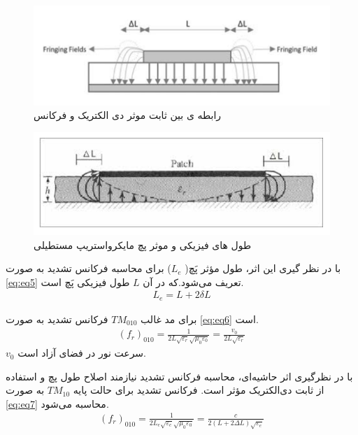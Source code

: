 \begin{figure}
	\centering
	\includegraphics[scale=0.3]{Images/fig10.png}
	\caption{رابطه ی بین ثابت موثر دی الکتریک و فرکانس}
	\label{fig10}
\end{figure}

\begin{figure}
	\centering
	\includegraphics[scale=0.3]{Images/fig11.png}
	\caption{طول های فیزیکی و موثر پچ مایکرواستریپ مستطیلی}
	\label{fig11}
\end{figure}

با در نظر گیری این اثر، طول مؤثر پَچ(
$L_{e}$)
برای محاسبه فرکانس تشدید به صورت 
\eqref{eq:eq5}
 تعریف می‌شود.که در آن 
 $L$
  طول فیزیکی پَچ است.
\begin{align}
	\label{eq:eq5}
	L_{e} = L + 2\delta L
\end{align}

برای مد غالب
$TM_{010}$
فرکانس تشدید به صورت 
\eqref{eq:eq6}
است.
\begin{align}
	\label{eq:eq6}
	(f_r)_{010} = \frac{1}{2L\sqrt{\varepsilon_r}\sqrt{\mu_0\varepsilon_0}} = \frac{v_0}{2L\sqrt{\varepsilon_r}}
\end{align}
$v_0$
سرعت نور در فضای آزاد است.

با در نظرگیری اثر حاشیه‌ای، محاسبه فرکانس تشدید نیازمند اصلاح طول پچ و استفاده از ثابت دی‌الکتریک مؤثر است. فرکانس تشدید برای حالت پایه
$TM_{10}$
 به صورت
\eqref{eq:eq7}
  محاسبه می‌شود.
\begin{align}
	\label{eq:eq7}
	(f_r)_{010} = \frac{1}{2L_{e}\sqrt{\varepsilon_{e}}\sqrt{\mu_0\varepsilon_0}} = \frac{c}{2(L+2\Delta L)\sqrt{\varepsilon_{e}}}
\end{align}

